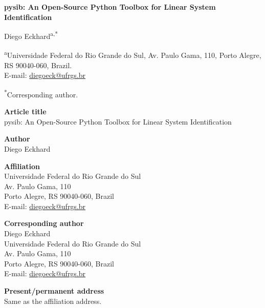 \documentclass[11pt]{article}
\begin{document}
\thispagestyle{empty}

\begin{center}
{\Large\bfseries pysib: An Open-Source Python Toolbox for Linear System Identification}

\vspace{1.5em}

Diego Eckhard\textsuperscript{a,*}

\vspace{1em}

\textsuperscript{a}Universidade Federal do Rio Grande do Sul, Av. Paulo Gama,
110, Porto Alegre, RS 90040-060, Brazil.\\
E-mail: \url{diegoeck@ufrgs.br}

\vspace{1em}

\textsuperscript{*}Corresponding author.
\end{center}

\vspace{2em}

\noindent\textbf{Article title}\\
pysib: An Open-Source Python Toolbox for Linear System Identification

\vspace{1em}

\noindent\textbf{Author}\\
Diego Eckhard

\vspace{1em}

\noindent\textbf{Affiliation}\\
Universidade Federal do Rio Grande do Sul\\
Av. Paulo Gama, 110\\
Porto Alegre, RS 90040-060, Brazil\\
E-mail: \url{diegoeck@ufrgs.br}

\vspace{1em}

\noindent\textbf{Corresponding author}\\
Diego Eckhard\\
Universidade Federal do Rio Grande do Sul\\
Av. Paulo Gama, 110\\
Porto Alegre, RS 90040-060, Brazil\\
E-mail: \url{diegoeck@ufrgs.br}

\vspace{1em}

\noindent\textbf{Present/permanent address}\\
Same as the affiliation address.
\end{document}
